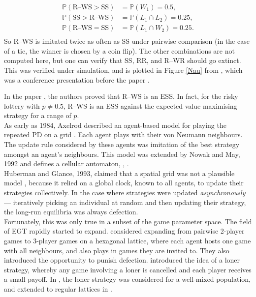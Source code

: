 \begin{align*}
    \mathbb P(\textrm{R--WS}> \textrm{SS}) &= \mathbb P(W_1) = 0.5, \\
    \mathbb P(\textrm{SS}>\textrm{R--WS}) &= \mathbb P(L_1 \cap L_2) = 0.25, \\
    \mathbb P(\textrm{R--WS} = \textrm{SS}) &= \mathbb P(L_1 \cap W_2) = 0.25.\\
\end{align*}
So R--WS is imitated twice as often as SS under pairwise comparison (in the case of a tie, the winner is chosen by a coin flip). The other combinations are not computed here, but one can verify that SS, RR, and R--WR should go extinct. This was verified under simulation, and is plotted in Figure \ref{Nau} from \cite{RN24}, which was a conference presentation before the paper \cite{RN30}. 

In the paper \cite{RN30}, the authors proved that R--WS is an ESS. In fact, for the risky lottery with $p \neq 0.5$, R--WS is an ESS against the expected value maximising strategy for a range of $p$. \\


As early as 1984, Axelrod described an agent-based model for playing the repeated PD on a grid \cite{RN63}. Each agent plays with their von Neumann neighbours. The update rule considered by these agents was imitation of the best strategy amongst an agent's neighbours. This model was extended by Nowak and May, 1992 and defines a cellular automaton, \cite{RN63}, \cite{RN70}. \\



 Huberman and Glance, 1993, claimed that a spatial grid was not a plausible model \cite{RN63}, because it relied on a global clock, known to all agents, to update their strategies collectively. In the case where strategies were updated \emph{asynchronously} --- iteratively picking an individual at random and then updating their strategy, the long-run equilibria was always defection. \\
 
 Fortunately, this was only true in a subset of the game parameter space. The field of EGT rapidly started to expand. \cite{RN45} considered expanding from pairwise 2-player games to 3-player games on a hexagonal lattice, where each agent hosts one game with all neighbours, and also plays in games they are invited to. They also introduced the opportunity to punish defection. \cite{RN66} introduced the idea of a loner strategy, whereby any game involving a loner is cancelled and each player receives a small payoff. In  \cite{RN67}, the loner strategy was considered for a well-mixed population, and extended to regular lattices in \cite{RN66}. \\
 
